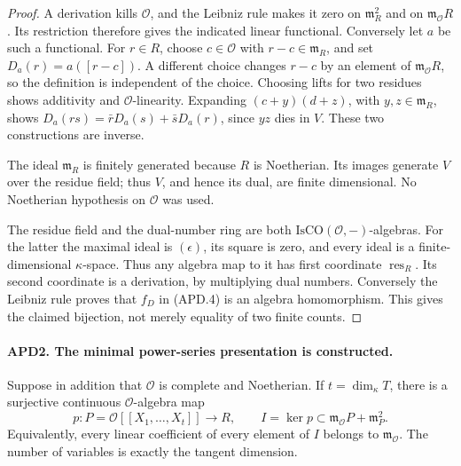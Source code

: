\begin{proof}
A derivation kills \(\mathcal O\), and the Leibniz rule makes it
zero on \(\mathfrak m_R^2\) and on
\(\mathfrak m_{\mathcal O}R\).  Its restriction therefore gives
the indicated linear functional.  Conversely let \(a\) be such
a functional.  For \(r\in R\), choose \(c\in\mathcal O\)
with \(r-c\in\mathfrak m_R\), and set
\(D_a(r)=a([r-c])\).  A different choice changes \(r-c\) by an
element of \(\mathfrak m_{\mathcal O}R\), so the definition is
independent of the choice.  Choosing lifts for two residues shows
additivity and \(\mathcal O\)-linearity.  Expanding
\((c+y)(d+z)\), with \(y,z\in\mathfrak m_R\), shows
\(D_a(rs)=\bar rD_a(s)+\bar sD_a(r)\), since \(yz\) dies in
\(V\).  These two constructions are inverse.

The ideal \(\mathfrak m_R\) is finitely generated because \(R\)
is Noetherian.  Its images generate \(V\) over the residue field;
thus \(V\), and hence its dual, are finite dimensional.  No
Noetherian hypothesis on \(\mathcal O\) was used.

The residue field and the dual-number ring are both
\(\mathrm{IsCO}(\mathcal O,-)\)-algebras.  For the latter the
maximal ideal is \((\epsilon)\), its square is zero, and every
ideal is a finite-dimensional \(\kappa\)-space.  Thus any algebra
map to it has first coordinate \(\operatorname{res}_R\).
Its second coordinate is a derivation, by multiplying dual numbers.
Conversely the Leibniz rule proves that \(f_D\) in (APD.4) is
an algebra homomorphism.  This gives the claimed bijection, not
merely equality of two finite counts.
\end{proof}

\paragraph{APD2. The minimal power-series presentation is constructed.}
\label{claim:APD2}
Suppose in addition that \(\mathcal O\) is complete and
Noetherian.  If \(t=\dim_\kappa T\), there is a surjective
continuous \(\mathcal O\)-algebra map
\[
 p:P=\mathcal O[[X_1,\ldots,X_t]]\longrightarrow R,
 \qquad I=\ker p\subset
        \mathfrak m_{\mathcal O}P+\mathfrak m_P^2.             \tag{APD.5}
\]
Equivalently, every linear coefficient of every element of \(I\)
belongs to \(\mathfrak m_{\mathcal O}\).  The number of variables
is exactly the tangent dimension.

